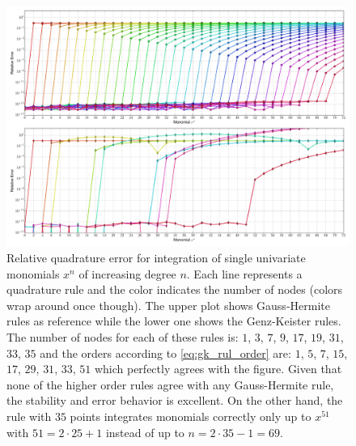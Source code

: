\documentclass[a4paper,10pt]{article}
\begin{document}
\begin{figure}
  \centering
  \includegraphics[width=\linewidth]{./img/monomial_errors_hermitephy.pdf}
  \caption{Relative quadrature error for integration of single univariate monomials $x^n$ of increasing degree $n$.
  Each line represents a quadrature rule and the color indicates the number of nodes (colors wrap around once though).
  The upper plot shows Gauss-Hermite rules as reference while the lower one shows the Genz-Keister rules.
  The number of nodes for each of these rules is:
  $1$, $3$, $7$,  $9$, $17$, $19$, $31$, $33$, $35$
  and the orders according to \eqref{eq:gk_rul_order} are:
  $1$, $5$, $7$, $15$, $17$, $29$, $31$, $33$, $51$
  which perfectly agrees with the figure. Given that none of the higher order rules agree with any Gauss-Hermite rule,
  the stability and error behavior is excellent. On the other hand, the rule with $35$ points integrates monomials
  correctly only up to $x^{51}$ with $51 = 2 \cdot 25 + 1$ instead of up to $n = 2 \cdot 35 - 1 = 69$.}
  \label{fig:conv_monom_hermite}
\end{figure}
\end{document}
